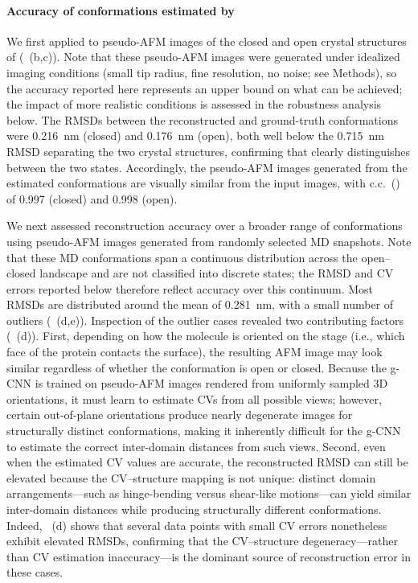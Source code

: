 \paragraph{Accuracy of conformations estimated by \Model}
We first applied \Model to pseudo-AFM images of the closed and open crystal structures of \AK (~(b,c)).
Note that these pseudo-AFM images were generated under idealized imaging conditions (small tip radius, fine resolution, no noise; see Methods), so the accuracy reported here represents an upper bound on what can be achieved; the impact of more realistic conditions is assessed in the robustness analysis below.
The RMSDs between the reconstructed and ground-truth conformations were 0.216~nm (closed) and 0.176~nm (open), both well below the 0.715~nm RMSD separating the two crystal structures, confirming that \Model clearly distinguishes between the two states.
Accordingly, the pseudo-AFM images generated from the estimated conformations are visually similar from the input images, with c.c.\ () of 0.997 (closed) and 0.998 (open).

We next assessed reconstruction accuracy over a broader range of conformations using pseudo-AFM images generated from randomly selected MD snapshots.
Note that these MD conformations span a continuous distribution across the open--closed landscape and are not classified into discrete states; the RMSD and CV errors reported below therefore reflect accuracy over this continuum.
Most RMSDs are distributed around the mean of 0.281~nm, with a small number of outliers (~(d,e)).
Inspection of the outlier cases revealed two contributing factors (~(d)).
First, depending on how the molecule is oriented on the stage (i.e., which face of the protein contacts the surface), the resulting AFM image may look similar regardless of whether the conformation is open or closed.
Because the g-CNN is trained on pseudo-AFM images rendered from uniformly sampled 3D orientations, it must learn to estimate CVs from all possible views; however, certain out-of-plane orientations produce nearly degenerate images for structurally distinct conformations, making it inherently difficult for the g-CNN to estimate the correct inter-domain distances from such views.
Second, even when the estimated CV values are accurate, the reconstructed RMSD can still be elevated because the CV--structure mapping is not unique: 
distinct domain arrangements---such as hinge-bending versus shear-like motions---can yield similar inter-domain distances while producing structurally different conformations.
Indeed, ~(d) shows that several data points with small CV errors nonetheless exhibit elevated RMSDs, confirming that the CV--structure degeneracy---rather than CV estimation inaccuracy---is the dominant source of reconstruction error in these cases.

